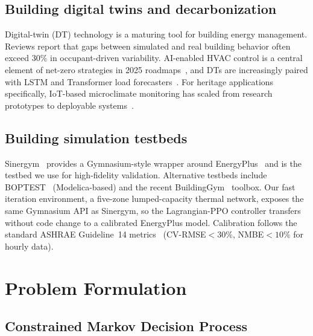 \subsection{Building digital twins and decarbonization}

Digital-twin (DT) technology is a maturing tool for building energy
management. Reviews \citep{dt_buildings_2025,dt_ieq_review_2025} report
that gaps between simulated and real building behavior often exceed
$30\%$ in occupant-driven variability. AI-enabled HVAC control is a
central element of net-zero strategies in 2025
roadmaps~\citep{ai_hvac_zeb_2025}, and DTs are increasingly paired with
LSTM and Transformer load forecasters~\citep{hybrid_lstm_transformer_load_2026,
lstm_transformer_power_2025}. For heritage applications specifically,
IoT-based microclimate monitoring has scaled from research prototypes
to deployable systems~\citep{iot_low_budget_museum_2022,
iot_microclimate_heritage_2024}.

\subsection{Building simulation testbeds}

Sinergym~\citep{manjavacas2024sinergym} provides a Gymnasium-style
wrapper around EnergyPlus~\citep{energyplus} and is the testbed we use
for high-fidelity validation. Alternative testbeds include
BOPTEST~\citep{boptest_mpc_2023} (Modelica-based) and the recent
BuildingGym~\citep{buildinggym_2025} toolbox. Our fast iteration
environment, a five-zone lumped-capacity thermal network, exposes the
same Gymnasium API as Sinergym, so the Lagrangian-PPO controller
transfers without code change to a calibrated EnergyPlus model.
Calibration follows the standard ASHRAE Guideline~14
metrics~\citep{ashrae_guideline14} (CV-RMSE${<}30\%$, NMBE${<}10\%$ for
hourly data).

\section{Problem Formulation}\label{sec:problem}

\subsection{Constrained Markov Decision Process}

